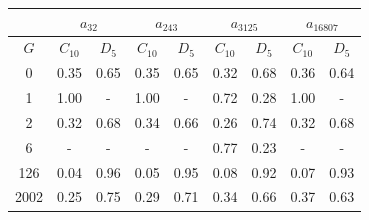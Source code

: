 \begin{table}[h]
   \begin{center}
        \begin{tabular}{c|c|c|c|c|c|c|c|c}
            \toprule
            & \multicolumn{2}{c|}{$a_{32}$} & \multicolumn{2}{c|}{$a_{243}$} & \multicolumn{2}{c|}{$a_{3125}$} & \multicolumn{2}{c}{$a_{16807}$} \\
            \midrule
            $G$ & $C_{10}$ & $D_{5}$ & $C_{10}$ & $D_{5}$ & $C_{10}$ & $D_{5}$ & $C_{10}$ & $D_{5}$ \\
            \midrule
            0 & 0.35 & 0.65 & 0.35 & 0.65 & 0.32 & 0.68 & 0.36 & 0.64 \\
            1 & 1.00 & - & 1.00 & - & 0.72 & 0.28 & 1.00 & - \\
            2 & 0.32 & 0.68 & 0.34 & 0.66 & 0.26 & 0.74 & 0.32 & 0.68 \\
            6 & - & - & - & - & 0.77 & 0.23 & - & - \\
            126 & 0.04 & 0.96 & 0.05 & 0.95 & 0.08 & 0.92 & 0.07 & 0.93 \\
            2002 & 0.25 & 0.75 & 0.29 & 0.71 & 0.34 & 0.66 & 0.37 & 0.63 \\
            \bottomrule
        \end{tabular}
   \end{center}
\end{table}
